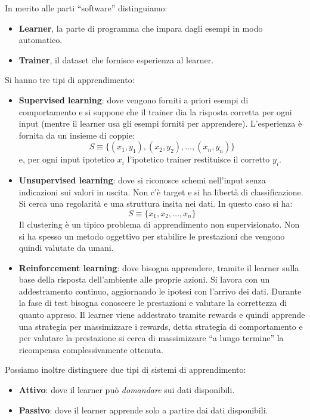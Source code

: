 In merito alle parti “software” distinguiamo:
\begin{itemize}
    \item \textbf{Learner}, la parte di programma che impara dagli esempi in modo automatico.
    \item \textbf{Trainer}, il dataset che fornisce esperienza al learner.
\end{itemize}
Si hanno tre tipi di apprendimento:
\begin{itemize}
    \item \textbf{Supervised learning}: dove vengono forniti a priori esempi di comportamento e si suppone che il trainer dia la risposta corretta per ogni input (mentre il learner usa gli esempi forniti per apprendere). L'esperienza è fornita da un insieme di coppie: 
    \begin{equation}
        S \equiv \{(x_1, y_1), (x_2, y_2), \dots, (x_n, y_n)\}
    \end{equation}
    e, per ogni input ipotetico $x_i$ l'ipotetico trainer restituisce il corretto $y_i$.
    \item \textbf{Unsupervised learning}: dove si riconosce schemi nell'input senza indicazioni sui valori in uscita. Non c'è target e si ha libertà di classificazione. Si cerca una regolarità e una struttura insita nei dati. In questo caso si ha:
    \begin{equation}
        S \equiv \{x_1, x_2, \dots, x_n\}
    \end{equation}
    Il clustering è un tipico problema di apprendimento non supervisionato. Non si ha spesso un metodo oggettivo per stabilire le prestazioni che vengono quindi valutate da umani.
    \item \textbf{Reinforcement learning}: dove bisogna apprendere, tramite il learner sulla base della risposta dell'ambiente alle proprie azioni. Si lavora con un addestramento continuo, aggiornando le ipotesi con l'arrivo dei dati. Durante la fase di test bisogna conoscere le prestazioni e valutare la correttezza di quanto appreso. Il learner viene addestrato tramite rewards e quindi apprende una strategia per massimizzare i rewards, detta strategia di comportamento e per valutare la prestazione si cerca di massimizzare “a lungo termine” la ricompensa complessivamente ottenuta.
\end{itemize}
 Possiamo inoltre distinguere due tipi di sistemi di apprendimento:
\begin{itemize}
    \item \textbf{Attivo}: dove il learner può \textit{domandare} sui dati disponibili.
    \item \textbf{Passivo}: dove il learner apprende solo a partire dai dati disponibili.
\end{itemize}

